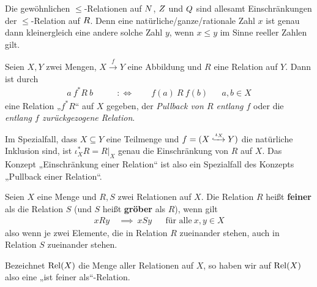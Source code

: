 \begin{bsp}
    Die gewöhnlichen $\le$-Relationen auf $\relax N$, $\relax Z$ und $\relax Q$ sind allesamt Einschränkungen der $\le$-Relation auf $\relax R$. Denn eine natürliche/ganze/rationale Zahl $x$ ist genau dann kleinergleich eine andere solche Zahl $y$, wenn $x\le y$ im Sinne reeller Zahlen gilt.
\end{bsp}


\begin{bem} \label{pullbackrel}
    Seien $X,Y$ zwei Mengen, $X\xrightarrow{f} Y$ eine Abbildung und $R$ eine Relation auf $Y$. Dann ist durch
    \begin{align*}
        a\ f^*R\ b \qquad& :\Leftrightarrow\qquad f(a)\ R\ f(b) &&a,b\in X
    \end{align*}
    eine Relation „$f^*R$“ auf $X$ gegeben, der \emph{Pullback von $R$ entlang $f$} oder die \emph{entlang $f$ zurückgezogene Relation}.

    Im Spezialfall, dass $X\subseteq Y$ eine Teilmenge und $f=(X\xhookrightarrow{\iota_X} Y)$ die natürliche Inklusion sind, ist $\iota_X^*R=R\vert_X$ genau die Einschränkung von $R$ auf $X$. Das Konzept „Einschränkung einer Relation“ ist also ein Spezialfall des Konzepts „Pullback einer Relation“.
\end{bem}


\begin{bsp} \label{def:groebererelation}  
    Seien $X$ eine Menge und $R,S$ zwei Relationen auf $X$. Die Relation $R$ heißt \textbf{feiner} als die Relation $S$ (und $S$ heißt \textbf{gröber} als $R$), wenn gilt
    \begin{align*}
        xRy \ &\implies\ xSy && \text{für alle}\ x,y\in X
    \end{align*}
    also wenn je zwei Elemente, die in Relation $R$ zueinander stehen, auch in Relation $S$ zueinander stehen.

    Bezeichnet $\operatorname{Rel}(X)$ die Menge aller Relationen auf $X$, so haben wir auf $\operatorname{Rel}(X)$ also eine „ist feiner als“-Relation.
\end{bsp}


